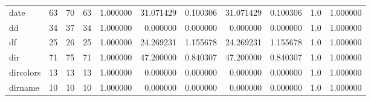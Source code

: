 \begin{tabular}{lrrrrrrrrrr}
date      &                                      63 &                 70 &                                63 &                                   1.000000 &                              31.071429 &                                     0.100306 &                         31.071429 &                                0.100306 &                                1.0 &                                           1.000000 \\
dd        &                                      34 &                 37 &                                34 &                                   1.000000 &                               0.000000 &                                     0.000000 &                          0.000000 &                                0.000000 &                                1.0 &                                           1.000000 \\
df        &                                      25 &                 26 &                                25 &                                   1.000000 &                              24.269231 &                                     1.155678 &                         24.269231 &                                1.155678 &                                1.0 &                                           1.000000 \\
dir       &                                      71 &                 75 &                                71 &                                   1.000000 &                              47.200000 &                                     0.840307 &                         47.200000 &                                0.840307 &                                1.0 &                                           1.000000 \\
dircolors &                                      13 &                 13 &                                13 &                                   1.000000 &                               0.000000 &                                     0.000000 &                          0.000000 &                                0.000000 &                                1.0 &                                           1.000000 \\
dirname   &                                      10 &                 10 &                                10 &                                   1.000000 &                               0.000000 &                                     0.000000 &                          0.000000 &                                0.000000 &                                1.0 &                                           1.000000 \\

\end{tabular}
